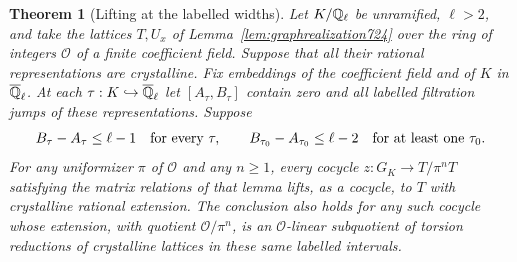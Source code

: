 \documentclass[a4paper,11pt]{article}
\newtheorem{theorem}[proposition]{Theorem}
\theoremstyle{definition}
\theoremstyle{remark}
\numberwithin{equation}{section}
\begin{document}
\begin{theorem}[Lifting at the labelled widths]\leavevmode
\label{thm:labelledlift735}
Let \(K/\mathbb Q_\ell\) be unramified, \(\ell>2\), and take the lattices
\(T,U_x\) of Lemma~\ref{lem:graphrealization724} over the ring of
integers \(\mathcal O\) of a finite coefficient field.
Suppose that all their rational representations are crystalline.
Fix embeddings of the coefficient field and of \(K\) in
\(\overline{\mathbb Q}_\ell\). At each \(\tau:K\hookrightarrow
\overline{\mathbb Q}_\ell\) let \([A_\tau,B_\tau]\) contain zero and
all labelled filtration jumps of these representations. Suppose
\[
 B_\tau-A_\tau\le\ell-1\quad\hbox{for every }\tau,\qquad
 B_{\tau_0}-A_{\tau_0}\le\ell-2\quad\hbox{for at least one }\tau_0 .
\]
For any uniformizer \(\pi\) of \(\mathcal O\) and any \(n\ge1\),
every cocycle \(z:G_K\to T/\pi^nT\) satisfying the matrix relations
of that lemma lifts, as a cocycle, to \(T\) with crystalline rational
extension. The conclusion also holds for any such cocycle whose
extension, with quotient \(\mathcal O/\pi^n\), is an
\(\mathcal O\)-linear subquotient of torsion reductions of crystalline
lattices in these same labelled intervals.
\end{theorem}
\end{document}
